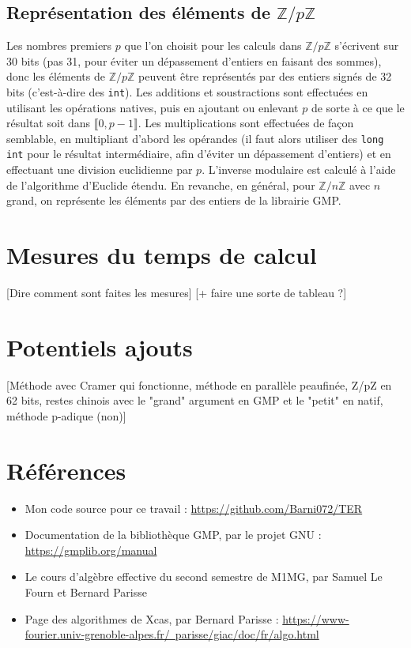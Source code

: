 \documentclass[french]{article}
\begin{document}
\subsection{Représentation des éléments de $\mathbb{Z}/p\mathbb{Z}$}
Les nombres premiers $p$ que l'on choisit pour les calculs dans $\mathbb{Z}/p\mathbb{Z}$ s'écrivent sur 30 bits (pas 31, pour éviter un dépassement d'entiers en faisant des sommes), donc les éléments de $\mathbb{Z}/p\mathbb{Z}$ peuvent être représentés par des entiers signés de 32 bits (c'est-à-dire des {\tt int}).
Les additions et soustractions sont effectuées en utilisant les opérations natives, puis en ajoutant ou enlevant $p$ de sorte à ce que le résultat soit dans $\llbracket0,p-1\rrbracket$.
Les multiplications sont effectuées de façon semblable, en multipliant d'abord les opérandes (il faut alors utiliser des {\tt long int} pour le résultat intermédiaire, afin d'éviter un dépassement d'entiers) et en effectuant une division euclidienne par $p$.
L'inverse modulaire est calculé à l'aide de l'algorithme d'Euclide étendu.
\newline
En revanche, en général, pour $\mathbb{Z}/n\mathbb{Z}$ avec $n$ grand, on représente les éléments par des entiers de la librairie GMP.
\section{Mesures du temps de calcul}
[Dire comment sont faites les mesures] [+ faire une sorte de tableau ?]
\section{Potentiels ajouts}
[Méthode avec Cramer qui fonctionne, méthode en parallèle peaufinée, Z/pZ en 62 bits, restes chinois avec le "grand" argument en GMP et le "petit" en natif, méthode p-adique (non)]
\section{Références}
\begin{itemize}
	\item Mon code source pour ce travail : \href{https://github.com/Barni072/TER}{https://github.com/Barni072/TER}
	\item Documentation de la bibliothèque GMP, par le projet GNU : \href{https://gmplib.org/manual/}{https://gmplib.org/manual}
	\item Le cours d'algèbre effective du second semestre de M1MG, par Samuel Le Fourn et Bernard Parisse
	\item Page des algorithmes de Xcas, par Bernard Parisse : \href{https://www-fourier.univ-grenoble-alpes.fr/~parisse/giac/doc/fr/algo.html}{https://www-fourier.univ-grenoble-alpes.fr/~parisse/giac/doc/fr/algo.html}
\end{itemize}
\end{document}
